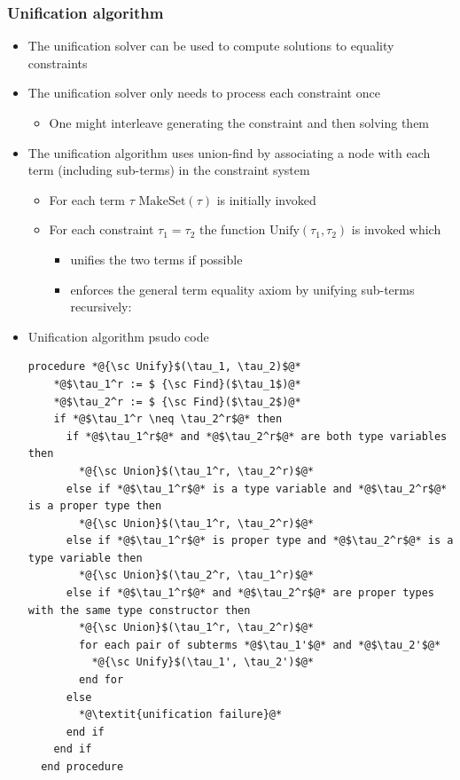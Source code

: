 \subsubsection{Unification algorithm}
\begin{itemize}
	\item The unification solver can be used to compute solutions to equality constraints
  \item The unification solver only needs to process each constraint once
  \begin{itemize}
  	\item One might interleave generating the constraint and then solving them
  \end{itemize}
  \item The unification algorithm uses union-find by associating a node with each term (including sub-terms) in the constraint system
  \begin{itemize}
	  \item For each term $\tau$ $\text{MakeSet}(\tau)$ is initially invoked
  	\item For each constraint $\tau_1 = \tau_2$ the function $\text{Unify}(\tau_1, \tau_2)$ is invoked which
    \begin{itemize}
      \item unifies the two terms if possible
	    \item enforces the general term equality axiom by unifying sub-terms recursively:
    \end{itemize}
  \end{itemize}
  \item Unification algorithm psudo code
\begin{lstlisting}[language = pseudocode, breaklines=true]
  procedure *@{\sc Unify}$(\tau_1, \tau_2)$@*
    *@$\tau_1^r := $ {\sc Find}($\tau_1$)@*
    *@$\tau_2^r := $ {\sc Find}($\tau_2$)@*
    if *@$\tau_1^r \neq \tau_2^r$@* then
      if *@$\tau_1^r$@* and *@$\tau_2^r$@* are both type variables then
        *@{\sc Union}$(\tau_1^r, \tau_2^r)$@*
      else if *@$\tau_1^r$@* is a type variable and *@$\tau_2^r$@* is a proper type then
        *@{\sc Union}$(\tau_1^r, \tau_2^r)$@*
      else if *@$\tau_1^r$@* is proper type and *@$\tau_2^r$@* is a type variable then 
        *@{\sc Union}$(\tau_2^r, \tau_1^r)$@*
      else if *@$\tau_1^r$@* and *@$\tau_2^r$@* are proper types with the same type constructor then
        *@{\sc Union}$(\tau_1^r, \tau_2^r)$@*
        for each pair of subterms *@$\tau_1'$@* and *@$\tau_2'$@*
          *@{\sc Unify}$(\tau_1', \tau_2')$@*
        end for
      else
        *@\textit{unification failure}@*
      end if
    end if
  end procedure
\end{lstlisting}
\end{itemize}

